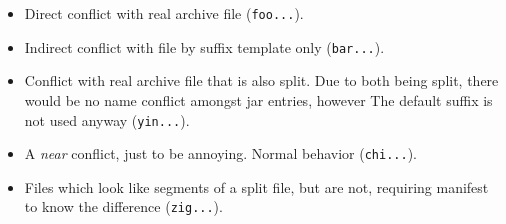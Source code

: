 \documentclass[a4paper, 12pt, pdftex]{report}
\begin{document}
\begin{itemize}
  \item Direct conflict with real archive file
        (\texttt{foo...}).

  \item Indirect conflict with file by suffix template only
        (\texttt{bar...}).

  \item Conflict with real archive file that is also split. Due to
        both being split, there would be no name conflict amongst jar
        entries, however The default suffix is not used anyway
        (\texttt{yin...}).

  \item A \emph{near} conflict, just to be annoying. Normal behavior
        (\texttt{chi...}).

  \item Files which look like segments of a split file, but are not,
        requiring manifest to know the difference (\texttt{zig...}).
\end{itemize}
\end{document}
